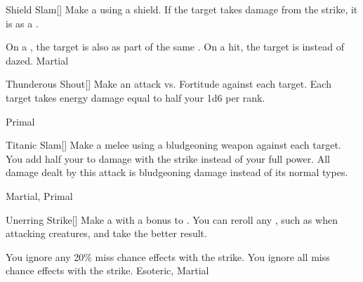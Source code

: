 \lowercase{\hypertarget{maneuver:Shield Slam}{}}\label{maneuver:Shield Slam}
\hypertarget{maneuver:Shield Slam}{}
\begin{freeability}[Rank 3]{Shield Slam}[]
Make a  using a shield.
If the target takes damage from the strike, it is  as a .

\rankline
{} On a , the target is also  as part of the same .
 On a hit, the target is  instead of dazed.
 Martial
\end{freeability}
\vspace{0.25em}



\lowercase{\hypertarget{maneuver:Thunderous Shout}{}}\label{maneuver:Thunderous Shout}
\hypertarget{maneuver:Thunderous Shout}{}
\begin{freeability}[Rank 3]{Thunderous Shout}[]
Make an attack vs. Fortitude against each target.
\hit Each target takes energy damage equal to half your  \add 1d6 per rank.


 Primal
\end{freeability}
\vspace{0.25em}



\lowercase{\hypertarget{maneuver:Titanic Slam}{}}\label{maneuver:Titanic Slam}
\hypertarget{maneuver:Titanic Slam}{}
\begin{freeability}[Rank 3]{Titanic Slam}[]
Make a melee  using a bludgeoning weapon against each target.
You add half your  to damage with the strike instead of your full power.
All damage dealt by this attack is bludgeoning damage instead of its normal types.


 Martial, Primal
\end{freeability}
\vspace{0.25em}



\lowercase{\hypertarget{maneuver:Unerring Strike}{}}\label{maneuver:Unerring Strike}
\hypertarget{maneuver:Unerring Strike}{}
\begin{freeability}[Rank 3]{Unerring Strike}[]
Make a  with a  bonus to .
You can reroll any , such as when attacking  creatures, and take the better result.

\rankline
{} You ignore any 20\% miss chance effects with the strike.
 You ignore all miss chance effects with the strike.
 Esoteric, Martial
\end{freeability}
\vspace{0.25em}



